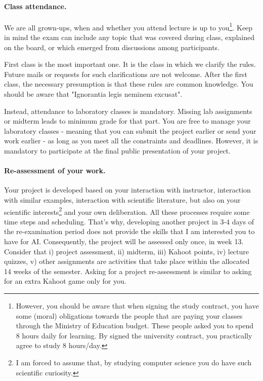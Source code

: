 \paragraph{Class attendance.} 
We are all grown-ups, when and whether you attend lecture 
is up to you\footnote{However, you should be aware that when signing the study contract, you have some (moral) obligations towards the people that are paying your classes through the Ministry of Education budget. 
These people asked you to spend 8 hours daily for learning. 
By signed the university contract, you practically agree to study 8 hours/day. }. 
Keep in mind the exam can include any topic that 
was covered during class, explained on the board, 
or which emerged from discussions among participants. 

First class is the most important one. 
It is the class in which we clarify the rules. 
Future mails or requests for such clarifications are not welcome. 
After the first class, the necessary presumption 
is that these rules are common knowledge.
You should be aware that "Ignorantia legis neminem excusat".


Instead, attendance to laboratory classes is mandatory.
Missing lab assignments or midterm leads to minimum grade for that part.
You are free to manage your laboratory classes - meaning that you can submit the project earlier or send your work earlier -  as long as you meet all the constraints and deadlines.
However, it is mandatory to participate at the final public presentation of your project. 

\paragraph{Re-assessment of your work.}
Your project is developed based on your interaction with instructor, 
interaction with similar examples, interaction with scientific literature, 
but also on your scientific interests\footnote{I am forced to assume that, 
by studying computer science you do have such scientific curiosity.} 
and your own deliberation.
All these processes require some time steps and scheduling.
That's why, developing another project in 3-4 days of the re-examination 
period does not provide the skills that I am interested you to have for AI.
Consequently, the project will be assessed only once, in week 13. 
Consider that 
i) project assessment,
ii) midterm,
iii) Kahoot points,
iv) lecture quizzes,
v) other assignments
are activities that take place within the allocated 14 weeks of the semester.
Asking for a project re-assessment is similar to asking for an extra Kahoot game only for you.





